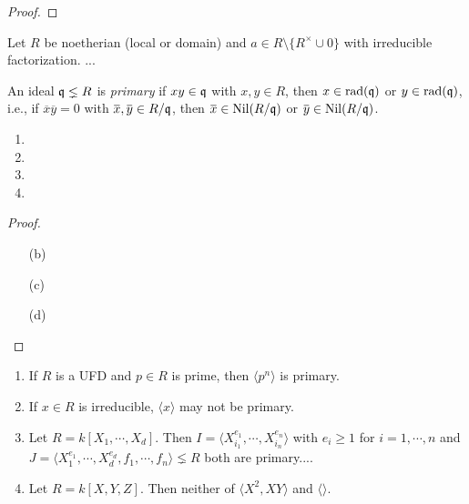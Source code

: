 \begin{proof}
\end{proof}

\begin{discussion}
    Let $R$ be noetherian (local or domain) and $a \in R \setminus \{R^{\times} \cup 0\}$ with irreducible factorization. ...
\end{discussion}

\begin{example}
\end{example}

\begin{definition}
    An ideal $\mathfrak{q} \lneq R$ is \emph{primary} if $xy \in \mathfrak{q}$ with $x,y \in R$, then $x \in \operatorname{rad}(\mathfrak{q})$ or $y \in \operatorname{rad}(\mathfrak{q})$, i.e., if $\overbar{x} \overbar{y} = 0$ with $\overbar{x}, \overbar{y} \in R/\ffq$, then $\overbar{x} \in \operatorname{Nil}(R/\ffq)$ or $\overbar{y} \in \operatorname{Nil}(R/\ffq)$. 
\end{definition}

\begin{example}
    \begin{enumerate}
        \item 
        \item
        \item 
        \item 
    \end{enumerate}
\end{example}

\begin{proof}
    \begin{enumerate}
        \item [(b)]
        \item [(c)]
        \item [(d)]
    \end{enumerate}
\end{proof}

\begin{example}
    \begin{enumerate}
        \item If $R$ is a UFD and $p \in R$ is prime, then $\langle p^{n} \rangle$ is primary.
        \item If $x \in R$ is irreducible, $\langle x \rangle$ may not be primary.
        \item Let $R = k[X_1,\cdots,X_d]$. Then $I = \langle X_{i_1}^{e_1}, \cdots ,X_{i_n}^{e_n} \rangle$ with $e_i \geq 1$ for $i = 1,\cdots,n$ and $J = \langle X_{1}^{e_1},\cdots,X_d^{e_d},f_1,\cdots,f_n \rangle \lneq R$ both are primary....
        \item Let $R = k[X,Y,Z]$. Then neither of $\langle X^{2},XY\rangle$ and $\langle \rangle$.
    \end{enumerate}
\end{example}


